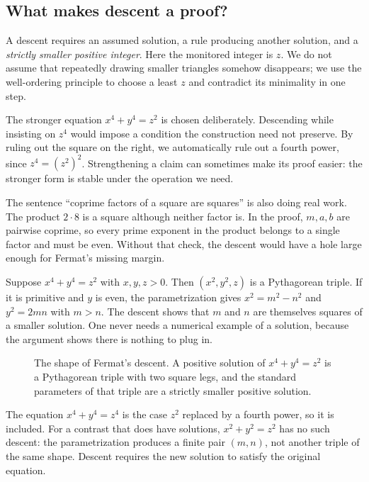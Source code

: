 \subsection*{What makes descent a proof?}
A descent requires an assumed solution, a rule producing another solution, and a \emph{strictly smaller positive integer}. Here the monitored integer is $z$. We do not assume that repeatedly drawing smaller triangles somehow disappears; we use the well-ordering principle to choose a least $z$ and contradict its minimality in one step.

The stronger equation $x^4+y^4=z^2$ is chosen deliberately. Descending while insisting on $z^4$ would impose a condition the construction need not preserve. By ruling out the square on the right, we automatically rule out a fourth power, since $z^4=(z^2)^2$. Strengthening a claim can sometimes make its proof easier: the stronger form is stable under the operation we need.

The sentence ``coprime factors of a square are squares'' is also doing real work. The product $2\cdot8$ is a square although neither factor is. In the proof, $m,a,b$ are pairwise coprime, so every prime exponent in the product belongs to a single factor and must be even. Without that check, the descent would have a hole large enough for Fermat's missing margin.

\begin{examplex}
Suppose $x^4+y^4=z^2$ with $x,y,z>0$. Then $(x^2,y^2,z)$ is a Pythagorean triple. If it is primitive and $y$ is even, the parametrization gives $x^2=m^2-n^2$ and $y^2=2mn$ with $m>n$. The descent shows that $m$ and $n$ are themselves squares of a smaller solution. One never needs a numerical example of a solution, because the argument shows there is nothing to plug in.
\end{examplex}

\begin{figure}[ht]
\centering
{}
\caption{The shape of Fermat's descent. A positive solution of $x^4+y^4=z^2$ is a Pythagorean triple with two square legs, and the standard parameters of that triple are a strictly smaller positive solution.}
\label{fig:t1-descent}
\end{figure}

\begin{examplex}
The equation $x^4+y^4=z^4$ is the case $z^2$ replaced by a fourth power, so it is included. For a contrast that does have solutions, $x^2+y^2=z^2$ has no such descent: the parametrization produces a finite pair $(m,n)$, not another triple of the same shape. Descent requires the new solution to satisfy the original equation.
\end{examplex}

